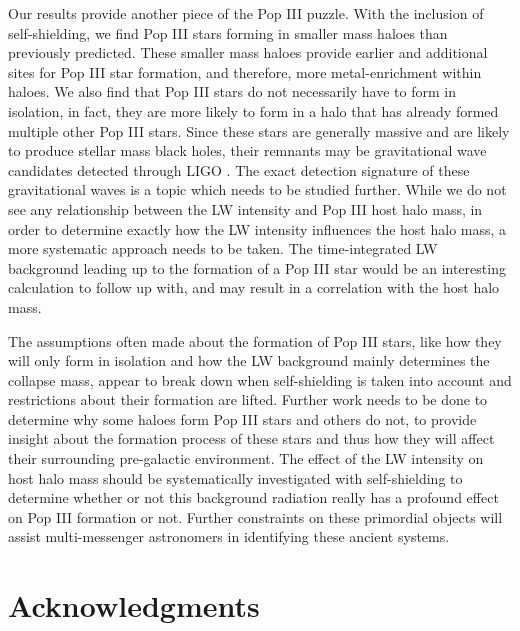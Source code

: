 \documentclass[fleqn,usenatbib]{mnras}
\begin{document}
Our results provide another piece of the Pop III puzzle. With the inclusion of \hh{} self-shielding, we find Pop III stars forming in smaller mass haloes than previously predicted. These smaller mass haloes provide earlier and additional sites for Pop III star formation, and therefore, more metal-enrichment within haloes. We also find that Pop III stars do not necessarily have to form in isolation, in fact, they are more likely to form in a halo that has already formed multiple other Pop III stars. Since these stars are generally massive and are likely to produce stellar mass black holes, their remnants may be gravitational wave candidates detected through LIGO \citep{Hartwig16}. The exact detection signature of these gravitational waves is a topic which needs to be studied further. While we do not see any relationship between the LW intensity and Pop III host halo mass,  in order to determine exactly how the LW intensity influences the host halo mass, a more systematic approach needs to be taken. The time-integrated LW background leading up to the formation of a Pop III star would be an interesting calculation to follow up with, and may result in a correlation with the host halo mass.

The assumptions often made about the formation of Pop III stars, like how they will only form in isolation and how the LW background mainly determines the collapse mass, appear to break down when self-shielding is taken into account and restrictions about their formation are lifted. Further work needs to be done to determine why some haloes form Pop III stars and others do not, to provide insight about the formation process of these stars and thus how they will affect their surrounding pre-galactic environment. The effect of the LW intensity on host halo mass should be systematically investigated with \hh{} self-shielding to determine whether or not this background radiation really has a profound effect on Pop III formation or not. Further constraints on these primordial objects will assist multi-messenger astronomers in identifying these ancient systems.

\section*{Acknowledgments}
\end{document}
